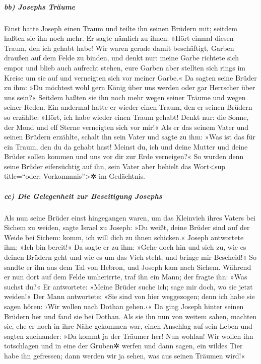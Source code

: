 \hypertarget{bb-josephs-truxe4ume}{%
\subparagraph{bb) Josephs Träume}\label{bb-josephs-truxe4ume}}

 Einst hatte Joseph einen Traum und teilte ihn seinen
Brüdern mit; seitdem haßten sie ihn noch mehr.  Er sagte
nämlich zu ihnen: »Hört einmal diesen Traum, den ich gehabt habe!
 Wir waren gerade damit beschäftigt, Garben draußen auf
dem Felde zu binden, und denkt nur: meine Garbe richtete sich empor und
blieb auch aufrecht stehen, eure Garben aber stellten sich rings im
Kreise um sie auf und verneigten sich vor meiner Garbe.« 
Da sagten seine Brüder zu ihm: »Du möchtest wohl gern König über uns
werden oder gar Herrscher über uns sein?« Seitdem haßten sie ihn noch
mehr wegen seiner Träume und wegen seiner Reden.  Ein
andermal hatte er wieder einen Traum, den er seinen Brüdern so erzählte:
»Hört, ich habe wieder einen Traum gehabt! Denkt nur: die Sonne, der
Mond und elf Sterne verneigten sich vor mir!«  Als er das
seinem Vater und seinen Brüdern erzählte, schalt ihn sein Vater und
sagte zu ihm: »Was ist das für ein Traum, den du da gehabt hast! Meinst
du, ich und deine Mutter und deine Brüder sollen kommen und uns vor dir
zur Erde verneigen?«  So wurden denn seine Brüder
eifersüchtig auf ihn, sein Vater aber behielt das Wort\textless sup
title=``oder: Vorkommnis''\textgreater✲ im Gedächtnis.

\hypertarget{cc-die-gelegenheit-zur-beseitigung-josephs}{%
\subparagraph{cc) Die Gelegenheit zur Beseitigung
Josephs}\label{cc-die-gelegenheit-zur-beseitigung-josephs}}

 Als nun seine Brüder einst hingegangen waren, um das
Kleinvieh ihres Vaters bei Sichem zu weiden,  sagte
Israel zu Joseph: »Du weißt, deine Brüder sind auf der Weide bei Sichem:
komm, ich will dich zu ihnen schicken.« Joseph antwortete ihm: »Ich bin
bereit!«  Da sagte er zu ihm: »Gehe doch hin und sieh zu,
wie es deinen Brüdern geht und wie es um das Vieh steht, und bringe mir
Bescheid!« So sandte er ihn aus dem Tal von Hebron, und Joseph kam nach
Sichem.  Während er nun dort auf dem Felde umherirrte,
traf ihn ein Mann; der fragte ihn: »Was suchst du?«  Er
antwortete: »Meine Brüder suche ich; sage mir doch, wo sie jetzt
weiden!«  Der Mann antwortete: »Sie sind von hier
weggezogen; denn ich habe sie sagen hören: ›Wir wollen nach Dothan
gehen.‹« Da ging Joseph hinter seinen Brüdern her und fand sie bei
Dothan.  Als sie ihn nun von weitem sahen, machten sie,
ehe er noch in ihre Nähe gekommen war, einen Anschlag auf sein Leben
 und sagten zueinander: »Da kommt ja der Träumer her!
 Nun wohlan! Wir wollen ihn totschlagen und in eine der
Gruben✲ werfen und dann sagen, ein wildes Tier habe ihn gefressen; dann
werden wir ja sehen, was aus seinen Träumen wird!«


